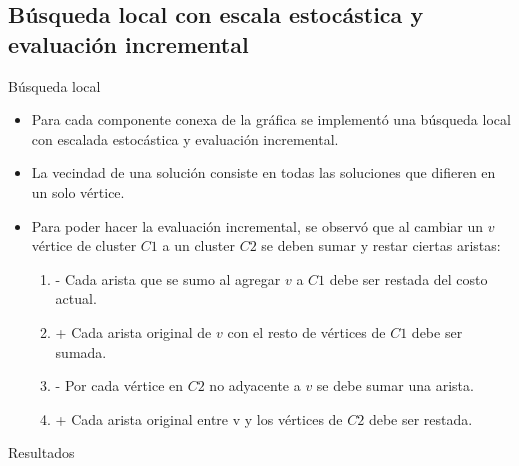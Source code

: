 \documentclass[10pt]{beamer}
\begin{document}
\subsection{Búsqueda local con escala estocástica y evaluación incremental}
\begin{frame}{Búsqueda local}
\begin{itemize}
\item Para cada componente conexa de la gráfica se implementó una búsqueda local con escalada estocástica y evaluación incremental. 
\item La vecindad de una solución consiste en todas las soluciones que difieren en un solo vértice.

\item Para poder hacer la evaluación incremental, se observó que al cambiar un $v$ vértice de cluster $C1$ a un cluster $C2$ se deben sumar y restar ciertas aristas:
\begin{enumerate}
\item - Cada arista que se sumo al agregar $v$ a $C1$ debe ser restada del costo actual.
\item + Cada arista original de $v$ con el resto de vértices de $C1$ debe ser sumada.
\item - Por cada vértice en $C2$ no adyacente a $v$ se debe sumar una arista.
\item + Cada arista original entre v y los vértices de $C2$ debe ser restada.
\end{enumerate}
\end{itemize}
\end{frame}
\begin{frame}{Resultados}

\end{frame}
\end{document}
